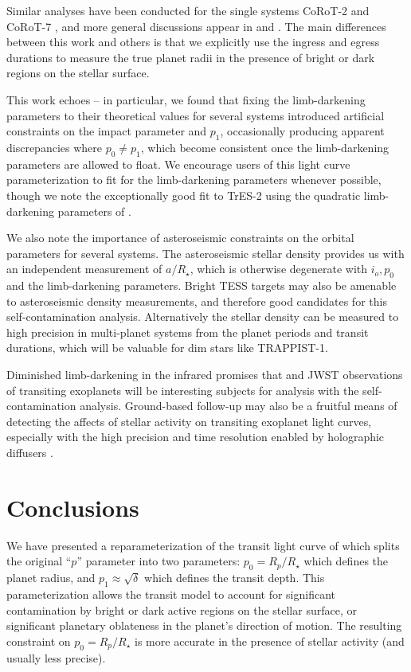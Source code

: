 Similar analyses have been conducted for the single systems CoRoT-2 \citep{Bruno2016} and CoRoT-7 \citep{Barros2014}, and more general discussions appear in \citet{Oshagh2013} and \citet{Csizmadia2013}. The main differences between this work and others is that we explicitly use the ingress and egress durations to measure the true planet radii in the presence of bright or dark regions on the stellar surface.

This work echoes \citet{Csizmadia2013} -- in particular, we found that fixing the limb-darkening parameters to their theoretical values for several systems introduced artificial constraints on the impact parameter and $p_1$, occasionally producing apparent discrepancies where $p_0 \neq p_1$, which become consistent once the limb-darkening parameters are allowed to float. We encourage users of this light curve parameterization to fit for the limb-darkening parameters whenever possible, though we note the exceptionally good fit to TrES-2 using the quadratic limb-darkening parameters of \citep{Magic2015}.

We also note the importance of asteroseismic constraints on the orbital parameters for several systems. The asteroseismic stellar density provides us with an independent measurement of $a/R_\star$, which is otherwise degenerate with $i_o, p_0$ and the limb-darkening parameters. Bright TESS targets may also be amenable to asteroseismic density measurements, and therefore good candidates for this self-contamination analysis. Alternatively the stellar density can be measured to high precision in multi-planet systems from the planet periods and transit durations, which will be valuable for dim stars like TRAPPIST-1.

Diminished limb-darkening in the infrared promises that \spitzer and JWST observations of transiting exoplanets will be interesting subjects for analysis with the self-contamination analysis. Ground-based follow-up may also be a fruitful means of detecting the affects of stellar activity on transiting exoplanet light curves, especially with the high precision and time resolution enabled by holographic diffusers \citep[see e.g.][]{Stefansson2017, Morris2018d}.

\section{Conclusions} \label{sec:conclusion}

We have presented a reparameterization of the transit light curve of \citet{Mandel2002} which splits the original ``$p$'' parameter into two parameters: $p_0 = R_p/R_\star$ which defines the planet radius, and $p_1 \approx \sqrt{\delta}$ which defines the transit depth. This parameterization allows the transit model to account for significant contamination by bright or dark active regions on the stellar surface, or significant planetary oblateness in the planet's direction of motion. The resulting constraint on $p_0 = R_p/R_\star$ is more accurate in the presence of stellar activity (and usually less precise).

